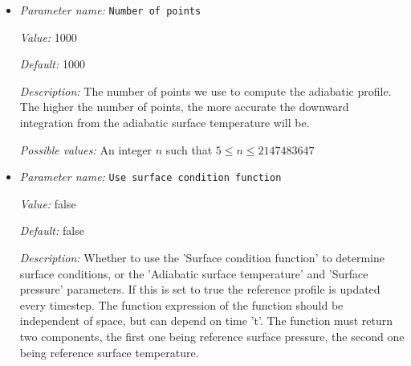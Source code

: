\begin{itemize}
{\it Default:} 0


{\it Description:} The formula that denotes the function you want to evaluate for particular values of the independent variables. This expression may contain any of the usual operations such as addition or multiplication, as well as all of the common functions such as `sin' or `cos'. In addition, it may contain expressions like `if(x>0, 1, -1)' where the expression evaluates to the second argument if the first argument is true, and to the third argument otherwise. For a full overview of possible expressions accepted see the documentation of the muparser library at http://muparser.beltoforion.de/.

If the function you are describing represents a vector-valued function with multiple components, then separate the expressions for individual components by a semicolon.


{\it Possible values:} Any string
\item {\it Parameter name:} {\tt Number of points}
\label{parameters:Adiabatic conditions model/Compute profile/Number of points}
\label{parameters:Adiabatic_20conditions_20model/Compute_20profile/Number_20of_20points}


{\it Value:} 1000


{\it Default:} 1000


{\it Description:} The number of points we use to compute the adiabatic profile. The higher the number of points, the more accurate the downward integration from the adiabatic surface temperature will be.


{\it Possible values:} An integer $n$ such that $5\leq n \leq 2147483647$
\item {\it Parameter name:} {\tt Use surface condition function}
\label{parameters:Adiabatic conditions model/Compute profile/Use surface condition function}
\label{parameters:Adiabatic_20conditions_20model/Compute_20profile/Use_20surface_20condition_20function}


{\it Value:} false


{\it Default:} false


{\it Description:} Whether to use the 'Surface condition function' to determine surface conditions, or the 'Adiabatic surface temperature' and 'Surface pressure' parameters. If this is set to true the reference profile is updated every timestep. The function expression of the function should be independent of space, but can depend on time 't'. The function must return two components, the first one being reference surface pressure, the second one being reference surface temperature.



\end{itemize}
